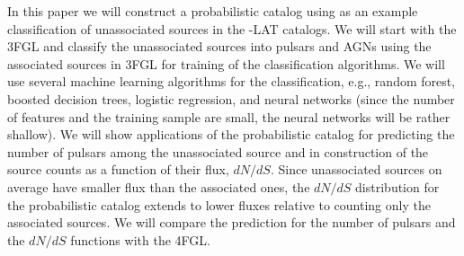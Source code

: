 In this paper we will construct a probabilistic catalog using as an example classification of unassociated sources in the \Fermi-LAT catalogs. 
We will start with the 3FGL and classify the unassociated sources into pulsars and AGNs using the associated sources in 3FGL for training of the classification algorithms.
We will use several machine learning algorithms for the classification, e.g., random forest, boosted decision trees, logistic regression,
and neural networks (since the number of features and the training sample are small, the neural networks will be rather shallow).
We will show applications of the probabilistic catalog for predicting the number of pulsars among the unassociated source and in construction of the source counts as a function of their flux, $dN/dS$.
Since unassociated sources on average have smaller flux than the associated ones, the $dN/dS$ distribution for the probabilistic catalog extends to lower fluxes relative to counting only the associated sources.
We will compare the prediction for the number of pulsars and the $dN/dS$ functions with the 4FGL.



